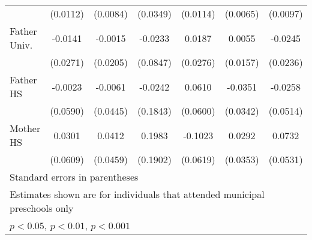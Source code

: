 \begin{table}[htbp]
\begin{tabular}{l*{6}{c}}
            &    (0.0112)         &    (0.0084)         &    (0.0349)         &    (0.0114)         &    (0.0065)         &    (0.0097)         \\
\addlinespace
Father Univ.&     -0.0141         &     -0.0015         &     -0.0233         &      0.0187         &      0.0055         &     -0.0245         \\
            &    (0.0271)         &    (0.0205)         &    (0.0847)         &    (0.0276)         &    (0.0157)         &    (0.0236)         \\
\addlinespace
Father HS   &     -0.0023         &     -0.0061         &     -0.0242         &      0.0610         &     -0.0351         &     -0.0258         \\
            &    (0.0590)         &    (0.0445)         &    (0.1843)         &    (0.0600)         &    (0.0342)         &    (0.0514)         \\
\addlinespace
Mother HS   &      0.0301         &      0.0412         &      0.1983         &     -0.1023         &      0.0292         &      0.0732         \\
            &    (0.0609)         &    (0.0459)         &    (0.1902)         &    (0.0619)         &    (0.0353)         &    (0.0531)         \\
\bottomrule
\multicolumn{7}{l}{\footnotesize Standard errors in parentheses}\\
\multicolumn{7}{l}{\footnotesize Estimates shown are for individuals that attended municipal preschools only}\\
\multicolumn{7}{l}{\footnotesize \sym{*} \(p<0.05\), \sym{**} \(p<0.01\), \sym{***} \(p<0.001\)}\\
\end{tabular}
\end{table}

